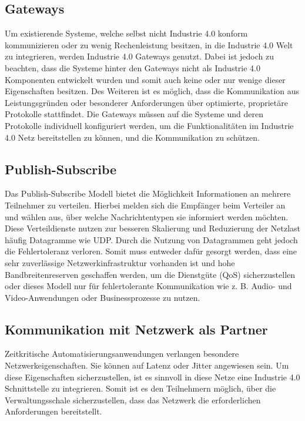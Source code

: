 \subsection{Gateways}
Um existierende Systeme, welche selbst nicht Industrie 4.0 konform kommunizieren oder zu wenig Rechenleistung besitzen, in die Industrie 4.0 Welt zu integrieren, werden Industrie 4.0 Gateways genutzt. Dabei ist jedoch zu beachten, dass die Systeme hinter den Gateways nicht als Industrie 4.0 Komponenten entwickelt wurden und somit auch keine oder nur wenige dieser Eigenschaften besitzen. Des Weiteren ist es möglich, dass die Kommunikation aus Leistungsgründen oder besonderer Anforderungen über optimierte, proprietäre Protokolle stattfindet. Die Gateways müssen auf die Systeme und deren Protokolle individuell konfiguriert werden, um die Funktionalitäten im Industrie 4.0 Netz bereitstellen zu können, und die Kommunikation zu schützen.

\subsection{Publish-Subscribe}
Das Publish-Subscribe Modell bietet die Möglichkeit Informationen an mehrere Teilnehmer zu verteilen. Hierbei melden sich die Empfänger beim Verteiler an und wählen aus, über welche Nachrichtentypen sie informiert werden möchten. Diese Verteildienste nutzen zur besseren Skalierung und Reduzierung der Netzlast häufig Datagramme wie \ac{UDP}. Durch die Nutzung von Datagrammen geht jedoch die Fehlertoleranz verloren. Somit muss entweder dafür gesorgt werden, dass eine sehr zuverlässige Netzwerkinfrastruktur vorhanden ist und hohe Bandbreitenreserven geschaffen werden, um die Dienstgüte (\ac{QoS}) sicherzustellen oder dieses Modell nur für fehlertolerante Kommunikation wie z. B. Audio- und Video-Anwendungen oder Businessprozesse zu nutzen. 

\subsection{Kommunikation mit Netzwerk als Partner}
Zeitkritische Automatisierungsanwendungen verlangen besondere Netzwerkeigenschaften. Sie können auf Latenz oder Jitter angewiesen sein. Um diese Eigenschaften sicherzustellen, ist es sinnvoll in diese Netze eine Industrie 4.0 Schnittstelle zu integrieren. Somit ist es den Teilnehmern möglich, über die Verwaltungsschale sicherzustellen, dass das Netzwerk die erforderlichen Anforderungen bereitstellt. \cite{sichKom2017}


